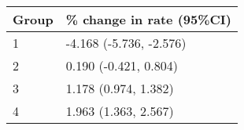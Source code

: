 \begin{tabular}{ll}
  \hline
Group & \% change in rate (95\%CI) \\ 
  \hline
   1 & -4.168 (-5.736, -2.576) \\ 
     2 & 0.190 (-0.421, 0.804) \\ 
     3 & 1.178 (0.974, 1.382) \\ 
     4 & 1.963 (1.363, 2.567) \\ 
   \hline
\end{tabular}


